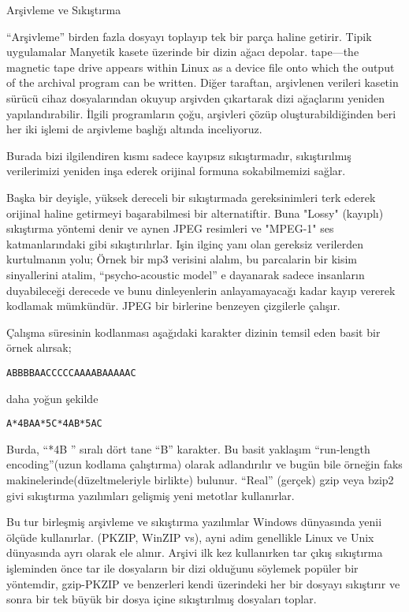 \begin{section}{Arşivleme ve Sıkıştırma}

“Arşivleme” birden fazla dosyayı toplayıp tek bir parça haline getirir. Tipik uygulamalar Manyetik kasete üzerinde bir dizin ağacı depolar. tape—the magnetic tape drive appears within Linux as a device file onto which the output of the archival program can be written. Diğer taraftan, arşivlenen verileri kasetin sürücü cihaz dosyalarından okuyup arşivden çıkartarak dizi ağaçlarını yeniden yapılandırabilir. İlgili programların çoğu, arşivleri
çözüp oluşturabildiğinden beri her iki işlemi de arşivleme başlığı altında inceliyoruz. 

Burada bizi ilgilendiren kısmı sadece kayıpsız sıkıştırmadır, sıkıştırılmış verilerimizi yeniden inşa ederek orijinal formuna sokabilmemizi sağlar.

Başka bir deyişle, yüksek dereceli bir sıkıştırmada gereksinimleri terk ederek orijinal haline getirmeyi başarabilmesi bir alternatiftir. Buna "Lossy" (kayıplı) sıkıştırma yöntemi denir  ve aynen JPEG resimleri ve "MPEG-1" ses katmanlarındaki gibi sıkıştırılırlar. Işin ilginç yanı olan gereksiz verilerden kurtulmanın yolu; Örnek bir mp3 verisini alalım, bu parcalarin bir kisim sinyallerini atalim, “psycho-acoustic model” e dayanarak sadece insanların duyabileceği derecede ve bunu dinleyenlerin anlayamayacağı kadar kayıp vererek kodlamak mümkündür. JPEG bir birlerine benzeyen çizgilerle çalışır.

Çalışma süresinin kodlanması aşağıdaki karakter dizinin temsil eden basit bir örnek alırsak;
\begin{verbatim}
ABBBBAACCCCCAAAABAAAAAC
\end{verbatim}

daha yoğun şekilde
\begin{verbatim}
A*4BAA*5C*4AB*5AC
\end{verbatim}

Burda, “*4B ” sıralı dört tane “B” karakter. Bu basit yaklaşım “run-length encoding”(uzun kodlama çalıştırma) olarak adlandırılır ve bugün bile örneğin faks makinelerinde(düzeltmeleriyle birlikte) bulunur. “Real” (gerçek) gzip veya bzip2 givi sıkıştırma yazılımları gelişmiş yeni metotlar kullanırlar.

Bu tur birleşmiş arşivleme ve sıkıştırma yazılımlar Windows dünyasında yenii ölçüde kullanırlar. (PKZIP, WinZIP vs), ayni adim genellikle Linux ve Unix dünyasında ayrı olarak ele alınır. Arşivi ilk kez kullanırken tar çıkış sıkıştırma işleminden önce tar ile dosyaların bir dizi olduğunu söylemek popüler bir yöntemdir, gzip-PKZIP ve benzerleri kendi üzerindeki her bir dosyayı sıkıştırır ve sonra bir tek büyük bir dosya içine sıkıştırılmış dosyaları toplar.


\end{section}
